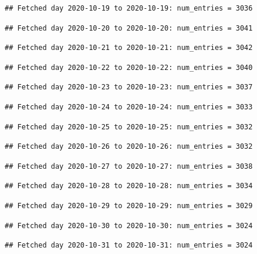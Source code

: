 \documentclass[]{article}
\begin{document}
\begin{verbatim}
## Fetched day 2020-10-19 to 2020-10-19: num_entries = 3036
\end{verbatim}

\begin{verbatim}
## Fetched day 2020-10-20 to 2020-10-20: num_entries = 3041
\end{verbatim}

\begin{verbatim}
## Fetched day 2020-10-21 to 2020-10-21: num_entries = 3042
\end{verbatim}

\begin{verbatim}
## Fetched day 2020-10-22 to 2020-10-22: num_entries = 3040
\end{verbatim}

\begin{verbatim}
## Fetched day 2020-10-23 to 2020-10-23: num_entries = 3037
\end{verbatim}

\begin{verbatim}
## Fetched day 2020-10-24 to 2020-10-24: num_entries = 3033
\end{verbatim}

\begin{verbatim}
## Fetched day 2020-10-25 to 2020-10-25: num_entries = 3032
\end{verbatim}

\begin{verbatim}
## Fetched day 2020-10-26 to 2020-10-26: num_entries = 3032
\end{verbatim}

\begin{verbatim}
## Fetched day 2020-10-27 to 2020-10-27: num_entries = 3038
\end{verbatim}

\begin{verbatim}
## Fetched day 2020-10-28 to 2020-10-28: num_entries = 3034
\end{verbatim}

\begin{verbatim}
## Fetched day 2020-10-29 to 2020-10-29: num_entries = 3029
\end{verbatim}

\begin{verbatim}
## Fetched day 2020-10-30 to 2020-10-30: num_entries = 3024
\end{verbatim}

\begin{verbatim}
## Fetched day 2020-10-31 to 2020-10-31: num_entries = 3024
\end{verbatim}
\end{document}
